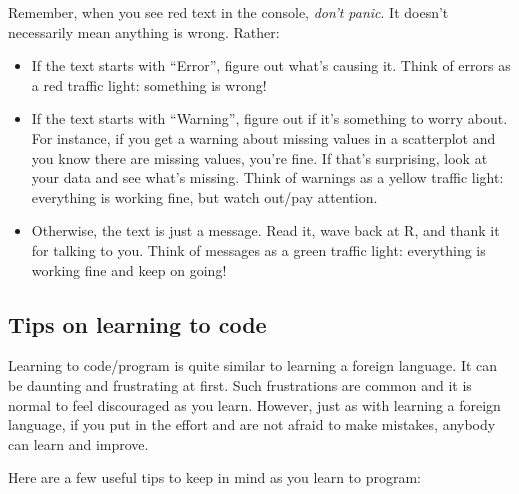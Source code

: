 \documentclass[]{book}
\providecommand{\tightlist}{%
  \setlength{\itemsep}{0pt}\setlength{\parskip}{0pt}}
\begin{document}
Remember, when you see red text in the console, \emph{don't panic}. It doesn't necessarily mean anything is wrong. Rather:

\begin{itemize}
\tightlist
\item
  If the text starts with ``Error'', figure out what's causing it. {Think of errors as a red traffic light: something is wrong!}
\item
  If the text starts with ``Warning'', figure out if it's something to worry about. For instance, if you get a warning about missing values in a scatterplot and you know there are missing values, you're fine. If that's surprising, look at your data and see what's missing. {Think of warnings as a yellow traffic light: everything is working fine, but watch out/pay attention.}
\item
  Otherwise, the text is just a message. Read it, wave back at R, and thank it for talking to you. {Think of messages as a green traffic light: everything is working fine and keep on going!}
\end{itemize}

\hypertarget{tips-code}{%
\subsection{Tips on learning to code}\label{tips-code}}

Learning to code/program is quite similar to learning a foreign language. It can be daunting and frustrating at first. Such frustrations are common and it is normal to feel discouraged as you learn. However, just as with learning a foreign language, if you put in the effort and are not afraid to make mistakes, anybody can learn and improve.

Here are a few useful tips to keep in mind as you learn to program:
\end{document}
